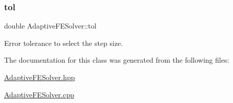 \subsubsection{\texorpdfstring{tol}{tol}}
{\footnotesize\ttfamily double Adaptive\+F\+E\+Solver\+::tol\hspace{0.3cm}{\ttfamily [private]}}



Error tolerance to select the step size. 



The documentation for this class was generated from the following files\+:\begin{DoxyCompactItemize}
\item 
\hyperlink{AdaptiveFESolver_8hpp}{Adaptive\+F\+E\+Solver.\+hpp}\item 
\hyperlink{AdaptiveFESolver_8cpp}{Adaptive\+F\+E\+Solver.\+cpp}\end{DoxyCompactItemize}
